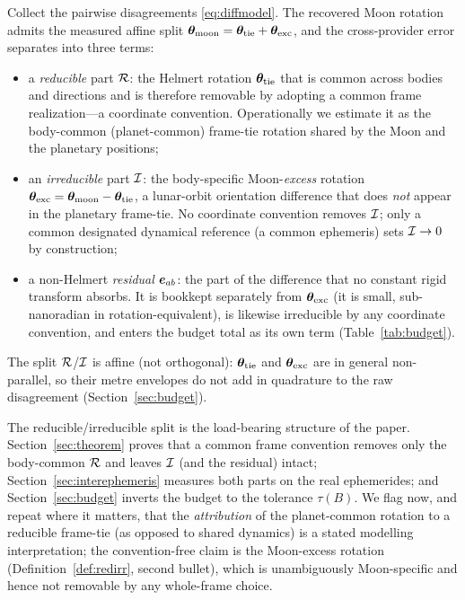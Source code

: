 \begin{definition}
\label{def:redirr}
Collect the pairwise disagreements \eqref{eq:diffmodel}. The recovered Moon rotation
admits the measured affine split
$\bm{\theta}_{\mathrm{moon}}=\bm{\theta}_{\mathrm{tie}}+\bm{\theta}_{\mathrm{exc}}$, and the cross-provider
error separates into three terms:
\begin{itemize}
  \item a \emph{reducible} part $\mathcal{R}$: the Helmert rotation
  $\bm{\theta}_{\mathrm{tie}}$ that is common across bodies and directions and is therefore
  removable by adopting a common frame realization---a coordinate convention.
  Operationally we estimate it as the body-common (planet-common) frame-tie rotation
  shared by the Moon and the planetary positions;
  \item an \emph{irreducible} part $\mathcal{I}$: the body-specific Moon-\emph{excess}
  rotation $\bm{\theta}_{\mathrm{exc}}=\bm{\theta}_{\mathrm{moon}}-\bm{\theta}_{\mathrm{tie}}$, a
  lunar-orbit orientation difference that does \emph{not} appear in the planetary
  frame-tie. No coordinate convention removes $\mathcal{I}$; only a common designated
  dynamical reference (a common ephemeris) sets $\mathcal{I}\to0$ by construction;
  \item a non-Helmert \emph{residual} $\bm{e}_{ab}$: the part of the difference that
  no constant rigid transform absorbs. It is bookkept separately from $\bm{\theta}_{\mathrm{exc}}$
  (it is small, sub-nanoradian in rotation-equivalent), is likewise irreducible by any
  coordinate convention, and enters the budget total as its own term
  (Table~\ref{tab:budget}).
\end{itemize}
The split $\mathcal{R}$/$\mathcal{I}$ is affine (not orthogonal): $\bm{\theta}_{\mathrm{tie}}$ and
$\bm{\theta}_{\mathrm{exc}}$ are in general non-parallel, so their metre envelopes do not add
in quadrature to the raw disagreement (Section~\ref{sec:budget}).
\end{definition}

\noindent The reducible/irreducible split is the load-bearing structure of the
paper. Section~\ref{sec:theorem} proves that a common frame convention removes only
the body-common $\mathcal{R}$ and leaves $\mathcal{I}$ (and the residual) intact;
Section~\ref{sec:interephemeris} measures both parts on the real ephemerides; and
Section~\ref{sec:budget} inverts the budget to the tolerance $\tau(B)$. We flag now,
and repeat where it matters, that the \emph{attribution} of the planet-common
rotation to a reducible frame-tie (as opposed to shared dynamics) is a stated
modelling interpretation; the convention-free claim is the Moon-excess rotation
(Definition~\ref{def:redirr}, second bullet), which is unambiguously Moon-specific and
hence not removable by any whole-frame choice.
